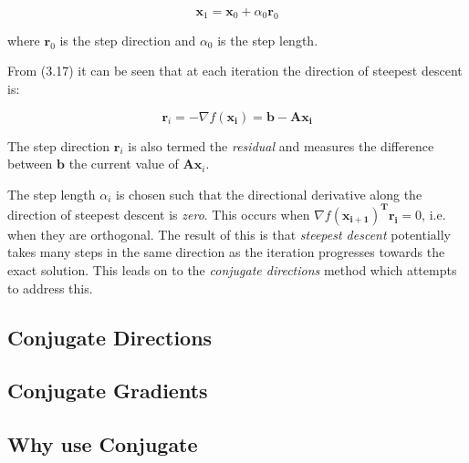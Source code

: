 \begin{equation}
\mathbf{x}_1=\mathbf{x}_0 + \alpha_0 \mathbf{r}_0
\end{equation}

where $\mathbf{r}_0$ is the step direction and $\alpha_0$ is the step length.

From (3.17) it can be seen that at each iteration the direction of steepest descent is:

\begin{equation}
\mathbf{r}_i = -\nabla f(\mathbf{x_i}) = \mathbf{b} - \mathbf{A}\mathbf{x_i}
\end{equation}

The step direction $\mathbf{r}_i$ is also termed the \emph{residual} and measures the difference between $\mathbf{b}$ the current value of $\mathbf{A}\mathbf{x}_i$.

The step length $\alpha_i$ is chosen such that the directional derivative along the direction of steepest descent is \emph{zero}. This occurs when $\nabla f(\mathbf{x_{i+1}})^\mathbf{T}\mathbf{r_i} = 0$, i.e. when they are orthogonal. The result of this is that \emph{steepest descent} potentially takes many steps in the same direction as the iteration progresses towards the exact solution. This leads on to the \emph{conjugate directions} method which attempts to address this.


%
%
\subsection{Conjugate Directions}



%
%
\subsection{Conjugate Gradients}



%
%
\subsection{Why use Conjugate }









